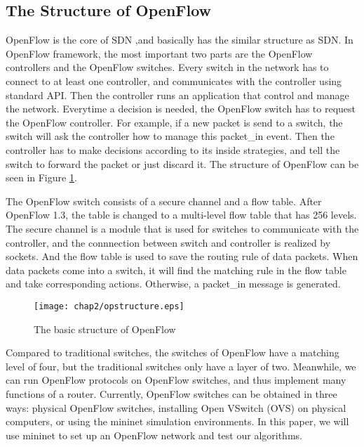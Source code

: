 \subsection{The Structure of OpenFlow}
\label{sec:The Structure of OpenFlow}

OpenFlow is the core of SDN ,and basically has the similar structure as SDN. In OpenFlow framework, the most important two parts are the OpenFlow controllers and the OpenFlow switches. Every switch in the network has to connect to at least one controller, and communicates with the controller using standard API. Then the controller runs an application that control and manage the network. Everytime a decision is needed, the OpenFlow switch has to request the OpenFlow controller. For example, if a new packet is send to a switch, the switch will ask the controller how to manage this packet\_in event. Then the controller has to make decisions according to its inside strategies, and tell the switch to forward the packet or just discard it. The structure of OpenFlow can be seen in Figure \ref{opstructure}.

The OpenFlow switch consists of a secure channel and a flow table. After OpenFlow 1.3, the table is changed to a multi-level flow table that has 256 levels. The secure channel is a module that is used for switches to communicate with the controller, and the connnection between switch and controller is realized by sockets. And the flow table is used to save the routing rule of data packets. When data packets come into a switch, it will find the matching rule in the flow table and take corresponding actions. Otherwise, a packet\_in message is generated.

\begin{figure}[htbp]
  \centering
  \texttt{[image: chap2/opstructure.eps]}
  \caption{The basic structure of OpenFlow}\label{opstructure}
\end{figure}

Compared to traditional switches, the switches of OpenFlow have a matching level of four, but the traditional switches only have a layer of two. Meanwhile, we can run OpenFlow protocols on OpenFlow switches, and thus implement many functions of a router. Currently, OpenFlow switches can be obtained in three ways: physical OpenFlow switches, installing Open VSwitch (OVS) on physical computers, or using the mininet simulation environments. In this paper, we will use mininet to set up an OpenFlow network and test our algorithms.

